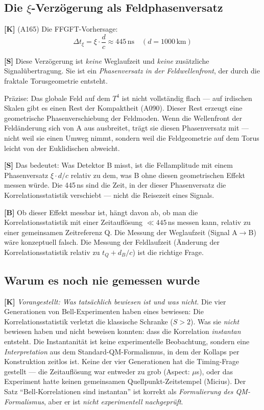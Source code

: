 \subsection{Die $\xi$-Verzögerung als Feldphasenversatz}

\textbf{[K]} (A165) Die FFGFT-Vorhersage:
\[
  \Delta t_\xi = \xi \cdot \frac{d}{c} \approx 445\,\text{ns}
  \quad (d = 1000\,\text{km})
\]

\textbf{[S]} Diese Verzögerung ist \emph{keine} Weglaufzeit und
\emph{keine} zusätzliche Signalübertragung. Sie ist ein
\emph{Phasenversatz in der Feldwellenfront}, der durch die fraktale
Torusgeometrie entsteht.

Präzise: Das globale Feld auf dem $T^4$ ist nicht vollständig flach ---
auf irdischen Skalen gibt es einen Rest der Kompaktheit (A090). Dieser
Rest erzeugt eine geometrische Phasenverschiebung der Feldmoden.
Wenn die Wellenfront der Feldänderung sich von A aus ausbreitet,
trägt sie diesen Phasenversatz mit --- nicht weil sie einen Umweg
nimmt, sondern weil die Feldgeometrie auf dem Torus leicht von
der Euklidischen abweicht.

\textbf{[S]} Das bedeutet: Was Detektor B misst, ist die Fellamplitude
mit einem Phasenversatz $\xi \cdot d/c$ relativ zu dem, was B ohne
diesen geometrischen Effekt messen würde. Die 445\,ns sind die Zeit,
in der dieser Phasenversatz die Korrelationsstatistik verschiebt ---
nicht die Reisezeit eines Signals.

\textbf{[B]} Ob dieser Effekt messbar ist, hängt davon ab, ob man
die Korrelationsstatistik mit einer Zeitauflösung $\ll 445$\,ns
messen kann, relativ zu einer gemeinsamen Zeitreferenz Q.
Die Messung der Weglaufzeit (Signal A$\to$B) wäre konzeptuell falsch.
Die Messung der Feldlaufzeit (Änderung der Korrelationsstatistik
relativ zu $t_Q + d_B/c$) ist die richtige Frage.

\subsection{Warum es noch nie gemessen wurde}

\textbf{[K]} \emph{Vorangestellt: Was tatsächlich bewiesen ist und was nicht.}
Die vier Generationen von Bell-Experimenten haben eines bewiesen: Die Korrelationsstatistik verletzt die klassische Schranke ($S > 2$). Was sie \emph{nicht} bewiesen haben und nicht beweisen konnten: dass die Korrelation \emph{instantan} entsteht. Die Instantanität ist keine experimentelle Beobachtung, sondern eine \emph{Interpretation} aus dem Standard-QM-Formalismus, in dem der Kollaps per Konstruktion zeitlos ist. Keine der vier Generationen hat die Timing-Frage gestellt --- die Zeitauflösung war entweder zu grob (Aspect: $\mu$s), oder das Experiment hatte keinen gemeinsamen Quellpunkt-Zeitstempel (Micius). Der Satz \enquote{Bell-Korrelationen sind instantan} ist korrekt als \emph{Formulierung des QM-Formalismus}, aber er ist \emph{nicht experimentell nachgeprüft}.

